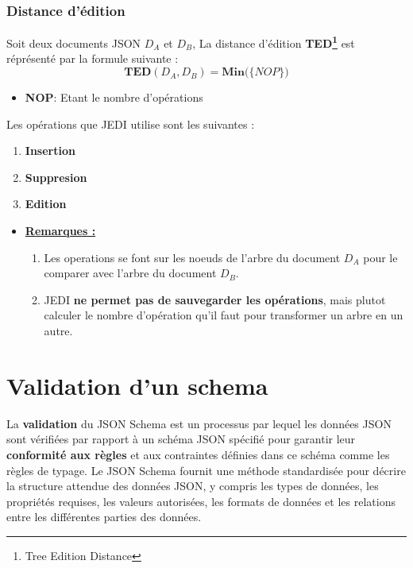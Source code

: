             \subsubsection{Distance d'édition}
                Soit deux documents JSON \textbf{$D_{A}$} et \textbf{$D_{B}$}, La distance d'édition \textbf{TED\footnote{Tree Edition Distance\cite{JEDI}}} est réprésenté par la formule suivante :
                \begin{equation}
                    \textbf{TED}(\textbf{$D_{A}$}, \textbf{$D_{B}$}) = \textbf{Min(\{} NOP\textbf{\})} 
                \end{equation}
                \begin{itemize}
                    \item [\textbullet] \textbf{NOP}: Etant le nombre d'opérations
                \end{itemize}
                Les opérations que JEDI utilise sont les suivantes : 
                \begin{enumerate}
                    \item \textbf{Insertion}
                    \item \textbf{Suppresion}
                    \item \textbf{Edition}
                \end{enumerate}

                \begin{itemize}
                    \item [\textbullet] \underline{\textbf{Remarques :}}
                    \begin{enumerate}
                        \item Les operations se font sur les noeuds de l'arbre du document \textbf{$D_{A}$} pour le comparer avec l'arbre du document \textbf{$D_{B}$}.
                        \item JEDI \textbf{ne permet pas de sauvegarder les opérations}, mais plutot calculer le nombre d'opération qu'il faut pour transformer un arbre en un autre.
                    \end{enumerate}
                \end{itemize}

    \section{Validation d'un schema}


        La \textbf{validation} du JSON Schema est un processus par lequel les données JSON sont vérifiées par rapport à un schéma JSON spécifié pour garantir leur \textbf{conformité aux règles} et aux contraintes définies dans ce schéma comme les règles de typage\cite{Validation}. Le JSON Schema fournit une méthode standardisée pour décrire la structure attendue des données JSON, y compris les types de données, les propriétés requises, les valeurs autorisées, les formats de données et les relations entre les différentes parties des données. \cite{FoundationOfJSONSchema}

